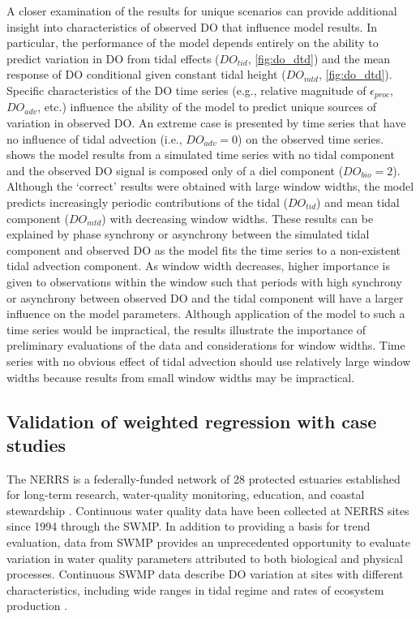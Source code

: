 \documentclass[letterpaper,12pt,oneside]{article}\usepackage[]{graphicx}\usepackage[]{color}
\begin{document}
A closer examination of the results for unique scenarios can provide additional insight into characteristics of observed \ac{DO} that influence model results.  In particular, the performance of the model depends entirely on the ability to predict variation in \ac{DO} from tidal effects ($DO_{tid}$, \cref{fig:do_dtd}) and the mean response of \ac{DO} conditional given constant tidal height ($DO_{mtd}$, \cref{fig:do_dtd}).  Specific characteristics of the \ac{DO} time series (e.g., relative magnitude of $\epsilon_{proc}$, $DO_{adv}$, etc.) influence the ability of the model to predict unique sources of variation in observed \ac{DO}.  An extreme case is presented by time series that have no influence of tidal advection (i.e., $DO_{adv} = 0$) on the observed time series.   shows the model results from a simulated time series with no tidal component and the observed \ac{DO} signal is composed only of a diel component ($DO_{bio} = 2$).  Although the `correct' results were obtained with large window widths, the model predicts increasingly periodic contributions of the tidal ($DO_{tid}$) and mean tidal component ($DO_{mtd}$) with decreasing window widths.  These results can be explained by phase synchrony or asynchrony between the simulated tidal component and observed \ac{DO} as the model fits the time series to a non-existent tidal advection component.  As window width decreases, higher importance is given to observations within the window such that periods with high synchrony or asynchrony between observed \ac{DO} and the tidal component will have a larger influence on the model parameters.  Although application of the model to such a time series would be impractical, the results illustrate the importance of preliminary evaluations of the data and considerations for window widths.  Time series with no obvious effect of tidal advection should use relatively large window widths because results from small window widths may be impractical.  
 
\subsection{Validation of weighted regression with case studies}

The \ac{NERRS} is a federally-funded network of 28 protected estuaries established for long-term research, water-quality monitoring, education, and coastal stewardship \citep{Wenner04}.  Continuous water quality data have been collected at \ac{NERRS} sites since 1994 through the \ac{SWMP}.  In addition to providing a basis for trend evaluation, data from \ac{SWMP} provides an unprecedented opportunity to evaluate variation in water quality parameters attributed to both biological and physical processes.  Continuous \ac{SWMP} data describe \ac{DO} variation at sites with different characteristics, including wide ranges in tidal regime \citep{Sanger02} and rates of ecosystem production \citep{Caffrey03}.  
\end{document}
